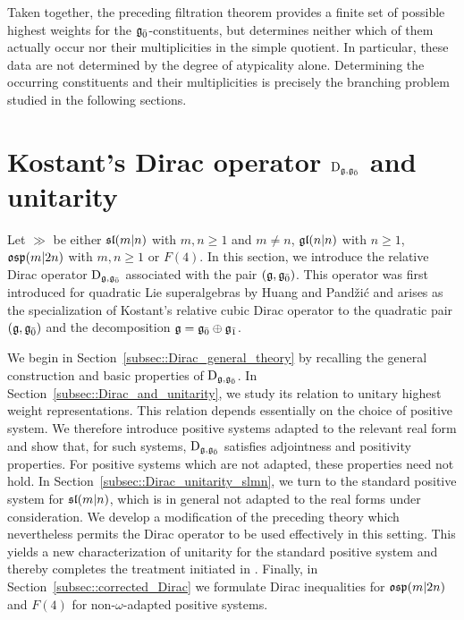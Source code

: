 Taken together, the preceding filtration theorem provides a finite set of possible highest weights for the $\even$-constituents, but determines neither which of them actually occur nor their multiplicities in the simple quotient. In particular, these data are not determined by the degree of atypicality alone. Determining the occurring constituents and their multiplicities is precisely the branching problem studied in the following sections.

\section{Kostant's Dirac operator \texorpdfstring{$\Dirac_{\gg,\even}$}{} and unitarity}
\label{sec::Kostants_cubic_Dirac_operator}
\noindent
Let $\gg$ be either $\sl(m\vert n)$ with $m,n\geq1$ and $m\neq n$, $\gl(n\vert n)$ with $n\geq1$, $\osp(m\vert 2n)$ with $m,n\geq1$ or $F(4)$. In this section, we introduce the relative Dirac operator $\Dirac_{\gg,\even}$ associated with the pair $(\gg,\even)$. This operator was first introduced for quadratic Lie superalgebras by Huang and Pandžić \cite{huang2005dirac} and arises as the specialization of Kostant's relative cubic Dirac operator \cite{Schmidt_perturbations,Schmidt_Wernli} to the quadratic pair $(\gg,\even)$ and the decomposition $\gg=\even\oplus\odd$. 

We begin in Section~\ref{subsec::Dirac_general_theory} by recalling the general construction and basic properties of $\Dirac_{\gg,\even}$. In Section~\ref{subsec::Dirac_and_unitarity}, we study its relation to unitary highest weight representations. This relation depends essentially on the choice of positive system. We therefore introduce positive systems adapted to the relevant real form and show that, for such systems, $\Dirac_{\gg,\even}$ satisfies adjointness and positivity properties. For positive systems which are not adapted, these properties need not hold. In Section~\ref{subsec::Dirac_unitarity_slmn}, we turn to the standard positive system for $\sl(m\vert n)$, which is in general not adapted to the real forms under consideration. We develop a modification of the preceding theory which nevertheless permits the Dirac operator to be used effectively in this setting. This yields a new characterization of unitarity for the standard positive system and thereby completes the treatment initiated in \cite{Schmidt}. Finally, in Section~\ref{subsec::corrected_Dirac} we formulate Dirac inequalities for $\osp(m\vert2n)$ and $F(4)$ for non-$\omega$-adapted positive systems. 
 



